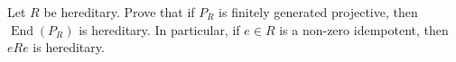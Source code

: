 Let $R$ be hereditary. Prove that if $P_R$ is finitely generated projective, then $\operatorname{End}(P_R)$ is hereditary. In particular, if $e \in R$ is a non-zero idempotent, then $eRe$ is hereditary.
